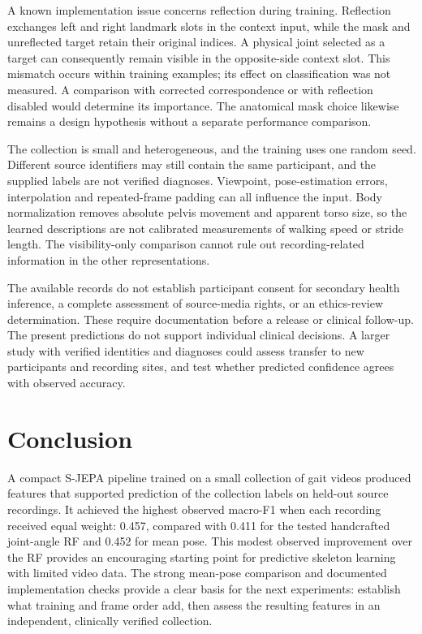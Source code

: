 \documentclass[10pt,twocolumn,letterpaper]{article}
\begin{document}
A known implementation issue concerns reflection during training. Reflection exchanges left and right landmark slots in the context input, while the mask and unreflected target retain their original indices. A physical joint selected as a target can consequently remain visible in the opposite-side context slot. This mismatch occurs within training examples; its effect on classification was not measured. A comparison with corrected correspondence or with reflection disabled would determine its importance. The anatomical mask choice likewise remains a design hypothesis without a separate performance comparison.

The collection is small and heterogeneous, and the training uses one random seed. Different source identifiers may still contain the same participant, and the supplied labels are not verified diagnoses. Viewpoint, pose-estimation errors, interpolation and repeated-frame padding can all influence the input. Body normalization removes absolute pelvis movement and apparent torso size, so the learned descriptions are not calibrated measurements of walking speed or stride length. The visibility-only comparison cannot rule out recording-related information in the other representations.

The available records do not establish participant consent for secondary health inference, a complete assessment of source-media rights, or an ethics-review determination. These require documentation before a release or clinical follow-up. The present predictions do not support individual clinical decisions. A larger study with verified identities and diagnoses could assess transfer to new participants and recording sites, and test whether predicted confidence agrees with observed accuracy.

\section{Conclusion}
A compact S-JEPA pipeline trained on a small collection of gait videos produced features that supported prediction of the collection labels on held-out source recordings. It achieved the highest observed macro-F1 when each recording received equal weight: 0.457, compared with 0.411 for the tested handcrafted joint-angle RF and 0.452 for mean pose. This modest observed improvement over the RF provides an encouraging starting point for predictive skeleton learning with limited video data. The strong mean-pose comparison and documented implementation checks provide a clear basis for the next experiments: establish what training and frame order add, then assess the resulting features in an independent, clinically verified collection.

{\small


}
\end{document}
